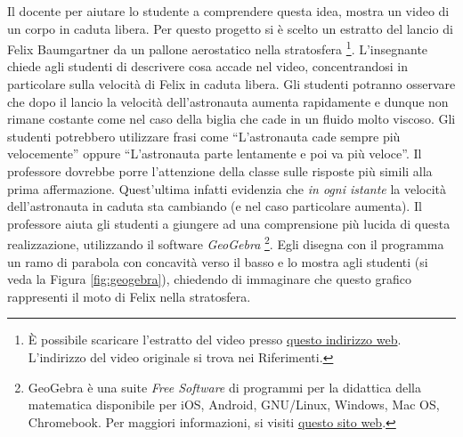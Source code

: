 \documentclass{report} \usepackage[T1]{fontenc} \usepackage[italian]{babel}
\begin{document}
Il docente per aiutare lo studente a comprendere questa idea,
mostra un video di un corpo in caduta libera. Per questo progetto
si è scelto un estratto del lancio di Felix Baumgartner da un
pallone aerostatico nella stratosfera
\footnote{
          \`E possibile scaricare l'estratto del video presso
          \textcolor{blue}{\href{https://github.com/savaroskij/PED1/blob/master/progetto_finale/media/video/felix_baumgartner.mp4?raw=true}{questo indirizzo web}}.
          L'indirizzo del video originale si trova nei Riferimenti\cite{felix}.
         }.
L'insegnante chiede agli studenti di descrivere cosa accade nel
video, concentrandosi in particolare sulla velocità di Felix in caduta
libera. Gli studenti potranno osservare che dopo il lancio la velocità
dell'astronauta aumenta rapidamente e dunque non rimane costante come nel
caso della biglia che cade in un fluido molto viscoso.
Gli studenti potrebbero utilizzare frasi come ``L'astronauta cade
sempre più velocemente'' oppure ``L'astronauta parte
lentamente e poi va più veloce''.
Il professore dovrebbe porre l'attenzione della classe sulle
risposte più simili alla prima affermazione. Quest'ultima
infatti evidenzia che \emph{in ogni istante} la velocità
dell'astronauta in caduta sta cambiando (e nel caso particolare aumenta).
Il professore aiuta gli studenti a giungere ad una comprensione
più lucida di questa realizzazione, utilizzando il software
\emph{GeoGebra}
\footnote{
          GeoGebra è una suite \emph{Free Software} di programmi per la didattica della
          matematica
          disponibile per iOS, Android, GNU/Linux, Windows, Mac OS, Chromebook.
          Per maggiori informazioni, si visiti
          \textcolor{blue}{\href{https://www.geogebra.org/}{questo sito web}}.
         }.
Egli disegna con il programma un ramo di parabola con concavità
verso il basso e lo mostra agli studenti (si veda la Figura
\ref{fig:geogebra}), chiedendo di immaginare che questo grafico
rappresenti il moto di Felix nella stratosfera.
\end{document}
